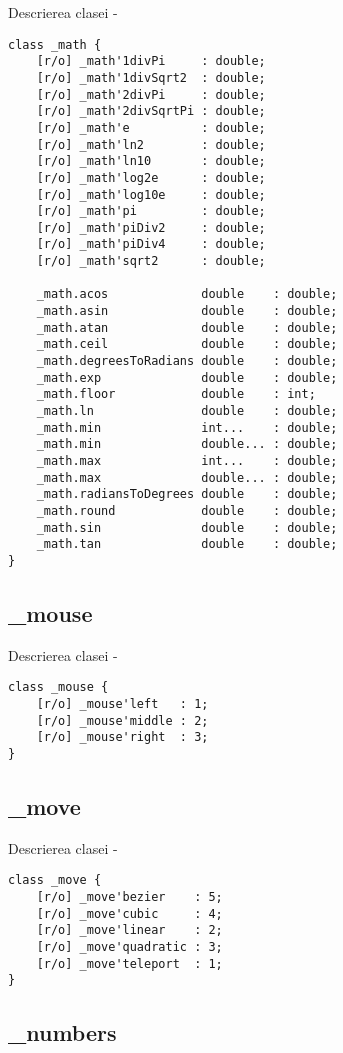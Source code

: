 \noindent Descrierea clasei  -
\begin{lstlisting}[numbers=none]
class _math {
	[r/o] _math'1divPi     : double;
	[r/o] _math'1divSqrt2  : double;
	[r/o] _math'2divPi     : double;
	[r/o] _math'2divSqrtPi : double;
	[r/o] _math'e          : double;
	[r/o] _math'ln2        : double;
	[r/o] _math'ln10       : double;
	[r/o] _math'log2e      : double;
	[r/o] _math'log10e     : double;
	[r/o] _math'pi         : double;
	[r/o] _math'piDiv2     : double;
	[r/o] _math'piDiv4     : double;
	[r/o] _math'sqrt2      : double;
	
	_math.acos             double    : double;
	_math.asin             double    : double;
	_math.atan             double    : double;
	_math.ceil             double    : double;
	_math.degreesToRadians double    : double;
	_math.exp              double    : double;
	_math.floor            double    : int;
	_math.ln               double    : double;
	_math.min              int...    : double;
	_math.min              double... : double;
	_math.max              int...    : double;
	_math.max              double... : double;
	_math.radiansToDegrees double    : double;
	_math.round            double    : double;
	_math.sin              double    : double;
	_math.tan              double    : double;
}
\end{lstlisting}

\subsection{{\color{orange} \_mouse}}

\noindent Descrierea clasei  -
\begin{lstlisting}[numbers=none]
class _mouse {
	[r/o] _mouse'left   : 1;
	[r/o] _mouse'middle : 2;
	[r/o] _mouse'right  : 3;
}
\end{lstlisting}

\subsection{{\color{orange} \_move}}

\noindent Descrierea clasei  -
\begin{lstlisting}[numbers=none]
class _move {
	[r/o] _move'bezier    : 5;
	[r/o] _move'cubic     : 4;
	[r/o] _move'linear    : 2;
	[r/o] _move'quadratic : 3;
	[r/o] _move'teleport  : 1;
}
\end{lstlisting}

\subsection{{\color{orange} \_numbers}}

